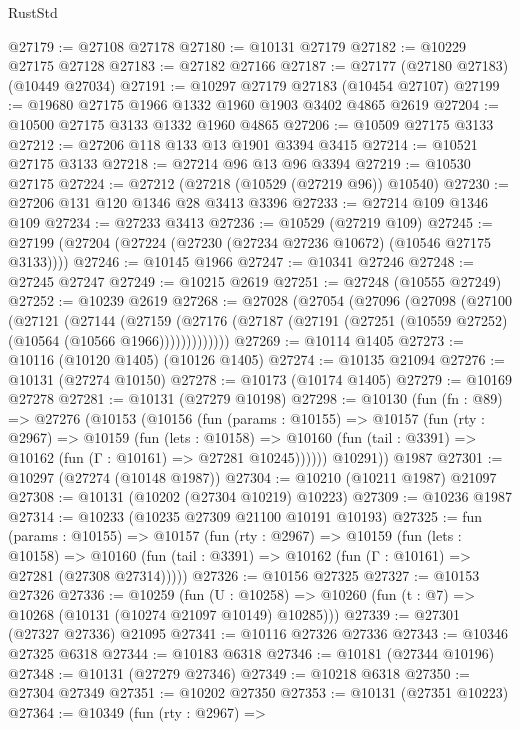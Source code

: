\begin{lexlean}{RustStd}
\begin{coremodule}
@27179 := @27108 @27178
@27180 := @10131 @27179
@27182 := @10229 @27175 @27128
@27183 := @27182 @27166
@27187 := @27177 (@27180 @27183) (@10449 @27034)
@27191 := @10297 @27179 @27183 (@10454 @27107)
@27199 := @19680 @27175 @1966 @1332 @1960 @1903 @3402 @4865 @2619
@27204 := @10500 @27175 @3133 @1332 @1960 @4865
@27206 := @10509 @27175 @3133
@27212 := @27206 @118 @133 @13 @1901 @3394 @3415
@27214 := @10521 @27175 @3133
@27218 := @27214 @96 @13 @96 @3394
@27219 := @10530 @27175
@27224 := @27212 (@27218 (@10529 (@27219 @96)) @10540)
@27230 := @27206 @131 @120 @1346 @28 @3413 @3396
@27233 := @27214 @109 @1346 @109
@27234 := @27233 @3413
@27236 := @10529 (@27219 @109)
@27245 := @27199 (@27204 (@27224 (@27230 (@27234 @27236 @10672) (@10546 @27175 @3133))))
@27246 := @10145 @1966
@27247 := @10341 @27246
@27248 := @27245 @27247
@27249 := @10215 @2619
@27251 := @27248 (@10555 @27249)
@27252 := @10239 @2619
@27268 := @27028
    (@27054
      (@27096
        (@27098
          (@27100
            (@27121
              (@27144
                (@27159
                  (@27176 (@27187 (@27191 (@27251 (@10559 @27252) (@10564 (@10566 @1966)))))))))))))
@27269 := @10114 @1405
@27273 := @10116 (@10120 @1405) (@10126 @1405)
@27274 := @10135 @21094
@27276 := @10131 (@27274 @10150)
@27278 := @10173 (@10174 @1405)
@27279 := @10169 @27278
@27281 := @10131 (@27279 @10198)
@27298 := @10130
    (fun (fn : @89) =>
    @27276
      (@10153
        (@10156
          (fun (params : @10155) =>
          @10157
            (fun (rty : @2967) =>
            @10159
              (fun (lets : @10158) =>
              @10160 (fun (tail : @3391) => @10162 (fun (Γ : @10161) => @27281 @10245))))))
        @10291))
    @1987
@27301 := @10297 (@27274 (@10148 @1987))
@27304 := @10210 (@10211 @1987) @21097
@27308 := @10131 (@10202 (@27304 @10219) @10223)
@27309 := @10236 @1987
@27314 := @10233 (@10235 @27309 @21100 @10191 @10193)
@27325 := fun (params : @10155) =>
  @10157
    (fun (rty : @2967) =>
    @10159
      (fun (lets : @10158) =>
      @10160 (fun (tail : @3391) => @10162 (fun (Γ : @10161) => @27281 (@27308 @27314)))))
@27326 := @10156 @27325
@27327 := @10153 @27326
@27336 := @10259
    (fun (U : @10258) => @10260 (fun (t : @7) => @10268 (@10131 (@10274 @21097 @10149) @10285)))
@27339 := @27301 (@27327 @27336) @21095
@27341 := @10116 @27326 @27336
@27343 := @10346 @27325 @6318
@27344 := @10183 @6318
@27346 := @10181 (@27344 @10196)
@27348 := @10131 (@27279 @27346)
@27349 := @10218 @6318
@27350 := @27304 @27349
@27351 := @10202 @27350
@27353 := @10131 (@27351 @10223)
@27364 := @10349
    (fun (rty : @2967) =>

\end{coremodule}
\end{lexlean}
